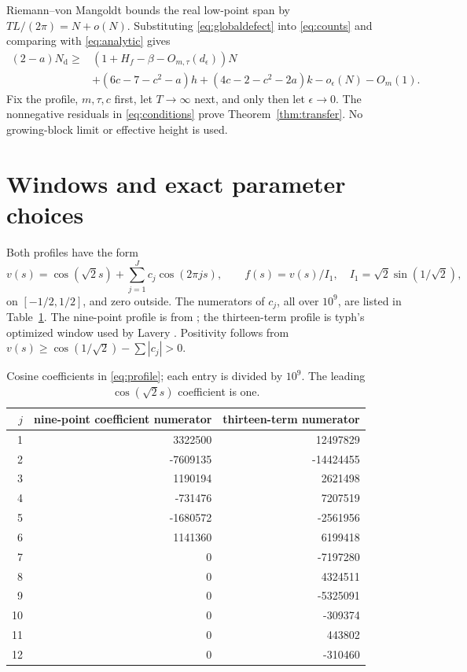 \documentclass[11pt]{article}
\newcommand{\Nd}{N_{\mathrm d}}
\theoremstyle{remark}\newtheorem{remark}[theorem]{Remark}
\begin{document}
Riemann--von Mangoldt bounds the real low-point span by
$TL/(2\pi)=N+o(N)$. Substituting \eqref{eq:globaldefect} into
\eqref{eq:counts} and comparing with \eqref{eq:analytic} gives
\begin{align*}
 (2-a)\Nd\ge{}&(1+H_f-\beta-O_{m,\tau}(d_\epsilon))N\\
 &+(6c-7-c^2-a)h+(4c-2-c^2-2a)k-o_\epsilon(N)-O_m(1).
\end{align*}
Fix the profile, $m,\tau,c$ first, let $T\to\infty$ next, and only then
let $\epsilon\to0$. The nonnegative residuals in \eqref{eq:conditions}
prove Theorem~\ref{thm:transfer}. No growing-block limit or effective height
is used.

\section{Windows and exact parameter choices}\label{sec:windows}
Both profiles have the form
\begin{equation}\label{eq:profile}
 v(s)=\cos(\sqrt2 s)+\sum_{j=1}^J c_j\cos(2\pi js),\qquad
 f(s)=v(s)/I_1,\quad I_1=\sqrt2\sin(1/\sqrt2),
\end{equation}
on $[-1/2,1/2]$, and zero outside. The numerators of $c_j$, all over
$10^9$, are listed in Table~\ref{tab:coeffs}. The nine-point profile is
from \cite{tawan}; the thirteen-term profile is typh's optimized window
used by Lavery \cite{lavery}. Positivity follows from
$v(s)\ge\cos(1/\sqrt2)-\sum |c_j|>0$.

\begin{table}[htbp]\centering\small
\begin{tabular}{r rr}\toprule
$j$ & nine-point coefficient numerator & thirteen-term numerator\\\midrule
1 & 3322500 & 12497829\\
2 & -7609135 & -14424455\\
3 & 1190194 & 2621498\\
4 & -731476 & 7207519\\
5 & -1680572 & -2561956\\
6 & 1141360 & 6199418\\
7 & 0 & -7197280\\
8 & 0 & 4324511\\
9 & 0 & -5325091\\
10 & 0 & -309374\\
11 & 0 & 443802\\
12 & 0 & -310460\\\bottomrule
\end{tabular}
\caption{Cosine coefficients in \eqref{eq:profile}; each entry is divided by
$10^9$. The leading $\cos(\sqrt2 s)$ coefficient is one.}\label{tab:coeffs}
\end{table}
\end{document}
